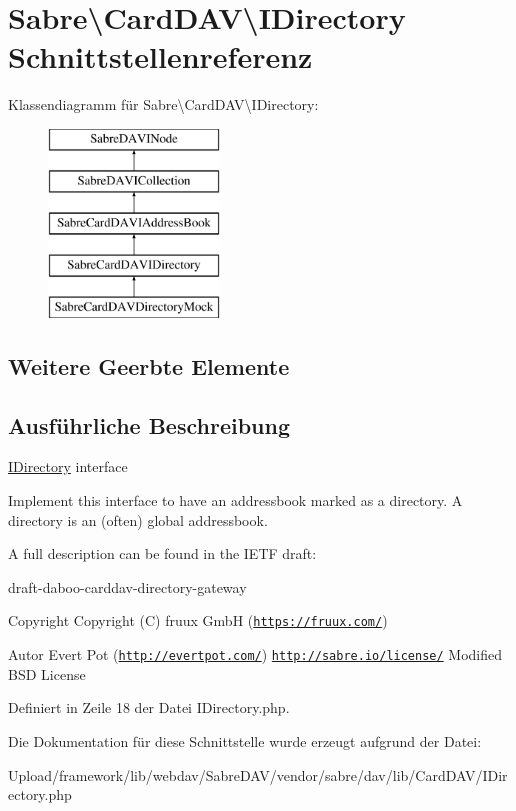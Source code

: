 \hypertarget{interface_sabre_1_1_card_d_a_v_1_1_i_directory}{}\section{Sabre\textbackslash{}Card\+D\+AV\textbackslash{}I\+Directory Schnittstellenreferenz}
\label{interface_sabre_1_1_card_d_a_v_1_1_i_directory}
Klassendiagramm für Sabre\textbackslash{}Card\+D\+AV\textbackslash{}I\+Directory\+:\begin{figure}[H]
\begin{center}
\leavevmode
\includegraphics[height=5.000000cm]{interface_sabre_1_1_card_d_a_v_1_1_i_directory}
\end{center}
\end{figure}
\subsection*{Weitere Geerbte Elemente}


\subsection{Ausführliche Beschreibung}
\mbox{\hyperlink{interface_sabre_1_1_card_d_a_v_1_1_i_directory}{I\+Directory}} interface

Implement this interface to have an addressbook marked as a \textquotesingle{}directory\textquotesingle{}. A directory is an (often) global addressbook.

A full description can be found in the I\+E\+TF draft\+:
\begin{DoxyItemize}
\item draft-\/daboo-\/carddav-\/directory-\/gateway
\end{DoxyItemize}

\begin{DoxyCopyright}{Copyright}
Copyright (C) fruux GmbH (\href{https://fruux.com/}{\tt https\+://fruux.\+com/}) 
\end{DoxyCopyright}
\begin{DoxyAuthor}{Autor}
Evert Pot (\href{http://evertpot.com/}{\tt http\+://evertpot.\+com/})  \href{http://sabre.io/license/}{\tt http\+://sabre.\+io/license/} Modified B\+SD License 
\end{DoxyAuthor}


Definiert in Zeile 18 der Datei I\+Directory.\+php.



Die Dokumentation für diese Schnittstelle wurde erzeugt aufgrund der Datei\+:\begin{DoxyCompactItemize}
\item 
Upload/framework/lib/webdav/\+Sabre\+D\+A\+V/vendor/sabre/dav/lib/\+Card\+D\+A\+V/I\+Directory.\+php\end{DoxyCompactItemize}
